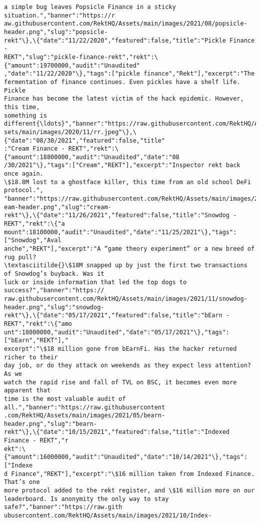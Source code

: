 \documentclass[11pt]{article}
\begin{document}
\begin{Verbatim}[commandchars=\\\{\}]
a simple bug leaves Popsicle Finance in a sticky situation.","banner":"https://r
aw.githubusercontent.com/RektHQ/Assets/main/images/2021/08/popsicle-
header.png","slug":"popsicle-
rekt"\},\{"date":"11/22/2020","featured":false,"title":"Pickle Finance -
REKT","slug":"pickle-finance-rekt","rekt":\{"amount":19700000,"audit":"Unaudited"
,"date":"11/22/2020"\},"tags":["pickle finance","Rekt"],"excerpt":"The
fermentation of finance continues. Even pickles have a shelf life. Pickle
Finance has become the latest victim of the hack epidemic. However, this time,
something is different{\ldots}","banner":"https://raw.githubusercontent.com/RektHQ/As
sets/main/images/2020/11/rr.jpeg"\},\{"date":"08/30/2021","featured":false,"title"
:"Cream Finance - REKT","rekt":\{"amount":18800000,"audit":"Unaudited","date":"08
/30/2021"\},"tags":["Cream","REKT"],"excerpt":"Inspector rekt back once again.
\$18.8M lost to a ghostface killer, this time from an old school DeFi protocol.",
"banner":"https://raw.githubusercontent.com/RektHQ/Assets/main/images/2021/08/cr
eam-header.png","slug":"cream-
rekt"\},\{"date":"11/26/2021","featured":false,"title":"Snowdog - REKT","rekt":\{"a
mount":18100000,"audit":"Unaudited","date":"11/25/2021"\},"tags":["Snowdog","Aval
anche","REKT"],"excerpt":"A “game theory experiment” or a new breed of rug pull?
\textasciitilde{}\$18M snapped up by just the first two transactions of Snowdog’s buyback. Was it
luck or inside information that led the top dogs to success?","banner":"https://
raw.githubusercontent.com/RektHQ/Assets/main/images/2021/11/snowdog-
header.png","slug":"snowdog-
rekt"\},\{"date":"05/17/2021","featured":false,"title":"bEarn - REKT","rekt":\{"amo
unt":18000000,"audit":"Unaudited","date":"05/17/2021"\},"tags":["bEarn","REKT"],"
excerpt":"\$18 million gone from bEarnFi. Has the hacker returned richer to their
day job, or do they attack on weekends as they expect less attention? As we
watch the rapid rise and fall of TVL on BSC, it becomes even more apparent that
time is the most valuable audit of all.","banner":"https://raw.githubusercontent
.com/RektHQ/Assets/main/images/2021/05/bearn-header.png","slug":"bearn-
rekt"\},\{"date":"10/15/2021","featured":false,"title":"Indexed Finance - REKT","r
ekt":\{"amount":16000000,"audit":"Unaudited","date":"10/14/2021"\},"tags":["Indexe
d Finance","REKT"],"excerpt":"\$16 million taken from Indexed Finance. That’s one
more protocol added to the rekt register, and \$16 million more on our
leaderboard. Is anonymity the only way to stay safe?","banner":"https://raw.gith
ubusercontent.com/RektHQ/Assets/main/images/2021/10/Index-

\end{Verbatim}
\end{document}
